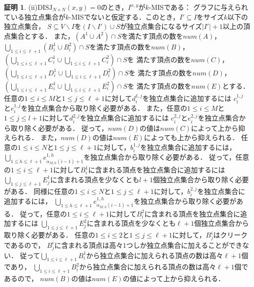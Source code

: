 \documentclass[12pt]{thesis}
\theoremstyle{definition}
\newtheorem*{prf*}{証明}
\begin{document}
\begin{prf*}
(ii)$\mathrm{DISJ}_{N \times N} (x, y) = 0$のとき，$I^{x,y}$が$k$-MISである：
グラフに与えられている独立点集合が$k$-MISでないと仮定する．このとき，$I'\subseteq I$をサイズ$k$以下の独立点集合，
$S\subseteq V\backslash I$を$(I \backslash I') \cup S$が独立点集合になるサイズ$|I'|+1$以上の頂点集合とする．
また，$(A^{1}\cup A^{2}) \cap S$を満たす頂点の数を$\mathit{num}(A)$，
$\bigcup_{1\leq i \leq \ell+1}(B_{i}^{1} \cup B_{i}^{2}) \cap S$を満たす頂点の数を$\mathit{num}(B)$，
$\left(\bigcup_{1\leq i \leq \ell+1}C_{i}^{1} \cup \bigcup_{1\leq i \leq \ell+1}C_{i}^{2}\right) \cap S$を
満たす頂点の数を$\mathit{num}(C)$，
\sloppy$\left(\bigcup_{1\leq i \leq \ell+1}D_{i}^{1} \cup \bigcup_{1\leq i \leq \ell+1}D_{i}^{2}\right) \cap S$を
満たす頂点の数を$\mathit{num}(D)$，
$\left(\bigcup_{1\leq i \leq \ell+1}E_{i}^{1} \cup \bigcup_{1\leq i \leq \ell+1}E_{i}^{2}\right) \cap S$を
満たす頂点の数を$\mathit{num}(E)$とする．
任意の$1\leq i \leq M$と$1\leq j \leq \ell+1$に対して$d^{1,j}_{i}$を独立点集合に追加するには
$c^{1,j}_{i}$と$e^{1,j}_{i}$を独立点集合から取り除く必要がある．
また，任意の$1\leq i \leq M$と$1\leq j \leq l+1$に対して$d^{2,j}_{i}$を独立点集合に追加するには
$c^{2,j}_{i}$と$e^{2,j}_{i}$を独立点集合から取り除く必要がある．
従って，$\mathit{num}(D)$の値は$\mathit{num}(C)$によって上から抑えられる．
また，$\mathit{num}(D)$の値は$\mathit{num}(E)$によっても上から抑えられる．
任意の$1\leq i \leq N$と$1\leq j \leq \ell+1$に対して，$b^{1,j}_{i}$を独立点集合に追加するには，
$\bigcup_{1\leq h \leq \ell+1} e^{1,h}_{\alpha_{M,h}(i-1)+1}$を独立点集合から取り除く必要がある．
従って，任意の$1\leq i \leq \ell+1$に対して$B^{1}_{i}$に含まれる頂点を独立点集合に追加するには
$\bigcup_{1\leq j \leq \ell+1}E^{1}_{j}$に含まれる頂点を少なくとも$l+1$個独立点集合から取り除く必要がある．
同様に任意の$1\leq i \leq N$と$1\leq j \leq \ell+1$に対して，$b^{2,j}_{i}$を独立点集合に追加するには，
$\bigcup_{1\leq h \leq \ell+1} e^{1,h}_{\alpha_{M,h}(i-1)+1}$を独立点集合から取り除く必要がある．
従って，任意の$1\leq i \leq \ell+1$に対して$B^{2}_{i}$に含まれる頂点を独立点集合に追加するには
$\bigcup_{1\leq j \leq \ell+1}E^{2}_{j}$に含まれる頂点を少なくとも$\ell+1$個独立点集合から取り除く必要がある．
任意の$1\leq i \leq 2$と$1\leq j \leq \ell+1$に対して，$B^{i}_{j}$はクリークであるので，
$B^{i}_{j}$に含まれる頂点は高々1つしか独立点集合に加えることができない．
従って$\bigcup_{1\leq i \leq \ell+1}B^{1}_{i}$から独立点集合に加えられる頂点の数は高々$\ell+1$個であり，
$\bigcup_{1\leq i \leq \ell+1}B^{2}_{i}$から独立点集合に加えられる頂点の数は高々$\ell+1$個であるので，
$\mathit{num}(B)$の値は$\mathit{num}(E)$の値によって上から抑えられる．

\end{prf*}
\end{document}
